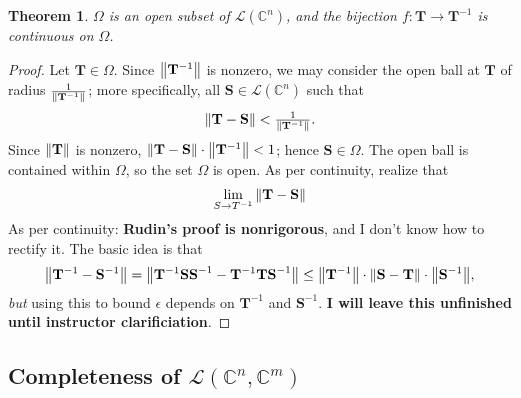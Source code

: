 \documentclass[11pt]{article}
\newcommand{\mat}[1]{\mathbf{#1}}
\newtheorem{theorem}{Theorem}
\begin{document}
\newpage

\begin{theorem}
	$\Omega$ is an open subset of $\mathcal{L}(\mathbb{C}^{n})$, and the bijection $f : \mat{T} \to \mat{T}^{-1}$ is continuous on $\Omega$.
\end{theorem}
\begin{adjustwidth}{0.5cm}{}
	\begin{proof}
		Let $\mat{T} \in \Omega$. Since $\norm{\mat{T}^{-1}}$ is nonzero, we may consider the open ball at $\mat{T}$ of radius $\tfrac{1}{\norm{\mat{T}^{-1}}}$; more specifically, all $\mat{S} \in \mathcal{L}(\mathbb{C}^{n})$ such that
		\[
			\norm{\mat{T} - \mat{S}} < \tfrac{1}{\norm{\mat{T}^{-1}}}.
		\]
		Since $\norm{\mat{T}}$ is nonzero, $\norm{\mat{T} - \mat{S}} \cdot \norm{\mat{T}^{-1}} < 1$; hence $\mat{S} \in \Omega$. The open ball is contained within $\Omega$, so the set $\Omega$ is open. As per continuity, realize that
		\[
			\lim\limits_{S \to T^{-1}} \norm{\mat{T} - \mat{S}}
		\]
		As per continuity: \textbf{Rudin's proof is nonrigorous}, and I don't know how to rectify it. The basic idea is that
		\[
			\norm{\mat{T}^{-1} - \mat{S}^{-1}} = \norm{\mat{T}^{-1}\mat{SS}^{-1} - \mat{T}^{-1}\mat{TS}^{-1}} \le \norm{\mat{T}^{-1}} \cdot \norm{\mat{S} - \mat{T}} \cdot \norm{\mat{S}^{-1}},
		\]
		\textit{but} using this to bound $\epsilon$ depends on $\mat{T}^{-1}$ and $\mat{S}^{-1}$. \textbf{I will leave this unfinished until instructor clarificiation}.
	\end{proof}
\end{adjustwidth}


\subsection{Completeness of \texorpdfstring{$\mathcal{L}(\mathbb{C}^{n}, \mathbb{C}^{m})$}{Matricies}}
\end{document}
